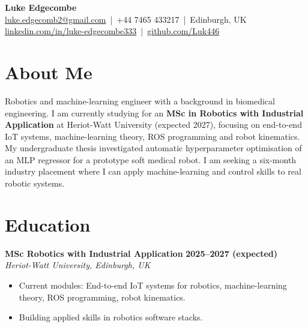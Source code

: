 \documentclass[a4paper,11pt]{article}
\begin{document}
\begin{center}
    {\LARGE \textbf{Luke Edgecombe}} \\[4pt]
    \href{mailto:luke.edgecomb2@gmail.com}{luke.edgecomb2@gmail.com} \,|\, +44 7465 433217 \,|\, Edinburgh, UK \\
    \href{https://linkedin.com/in/luke-edgecombe333}{linkedin.com/in/luke-edgecombe333} \,|\, 
    \href{https://github.com/Luk446}{github.com/Luk446}
\end{center}

\vspace{0.3cm}


\section*{About Me}
Robotics and machine-learning engineer with a background in biomedical engineering. I am currently studying for an \textbf{MSc in Robotics with Industrial Application} at Heriot-Watt University (expected 2027), focusing on end-to-end IoT systems, machine-learning theory, ROS programming and robot kinematics. My undergraduate thesis investigated automatic hyperparameter optimisation of an MLP regressor for a prototype soft medical robot. I am seeking a six-month industry placement where I can apply machine-learning and control skills to real robotic systems.


\section*{Education}

\textbf{MSc Robotics with Industrial Application} \hfill \textbf{2025--2027 (expected)}\\
    \textit{Heriot-Watt University, Edinburgh, UK}
\begin{itemize}
    \item Current modules: End-to-end IoT systems for robotics, machine-learning theory, ROS programming, robot kinematics.
    \item Building applied skills in robotics software stacks.
\end{itemize}
\end{document}

